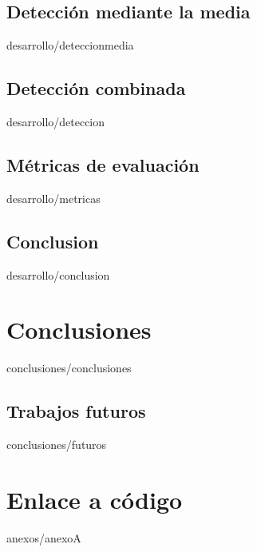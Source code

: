 \documentclass[epsbased,copyright,final,printable,covers,extendedindex,firstnumbered,tfg,gnuplot]{tfgtfmthesisuam}
\begin{document}
  \section{Detección mediante la media\label{SEC:DETECCIONMEDIA}}{desarrollo/deteccionmedia}
  \section{Detección combinada\label{SEC:DETECCION}}{desarrollo/deteccion}
  \section{Métricas de evaluación\label{SEC:METRICAS}}{desarrollo/metricas}
  \section{Conclusion\label{SEC:DPCONCLUSION}}{desarrollo/conclusion}
\chapter{Conclusiones\label{CAP:CONCLUSIONES}}{conclusiones/conclusiones}
  \section{Trabajos futuros\label{SEC:FUTUROS}}{conclusiones/futuros}

\appendix

\chapter{Enlace a código\label{CAP:ANEXOA}}{anexos/anexoA}
\end{document}
